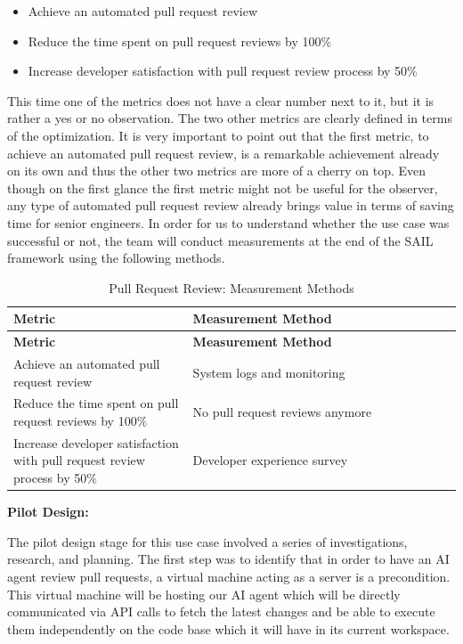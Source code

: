\documentclass[]{imc-inf}
\def\tightlist{}
\begin{document}
\begin{itemize}
	\tightlist
	\item
	Achieve an automated pull request review 
	\item
	Reduce the time spent on pull request reviews by 100\%
	\item
	Increase developer satisfaction with pull request review process by 50\%
\end{itemize}

This time one of the metrics does not have a clear number next to it, but it is rather a yes or no observation. The two other metrics are clearly defined in terms of the optimization. It is very important to point out that the first metric, to achieve an automated pull request review, is a remarkable achievement already on its own and thus the other two metrics are more of a cherry on top. Even though on the first glance the first metric might not be useful for the observer, any type of automated pull request review already brings value in terms of saving time for senior engineers. In order for us to understand whether the use case was successful or not, the team will conduct measurements at the end of the SAIL framework using the following methods. 

\begin{longtable}{|p{0.4\linewidth}|p{0.6\linewidth}|}
	\hline
	\textbf{Metric} & \textbf{Measurement Method} \\
	\hline
	\endfirsthead
	\hline
	\textbf{Metric} & \textbf{Measurement Method} \\
	\hline
	\endhead
	\hline
	\caption{Pull Request Review: Measurement Methods}
	\label{tab:pr_review_metrics}
	\endlastfoot
	
	Achieve an automated pull request review &
	System logs and monitoring \\
	\hline
	
	Reduce the time spent on pull request reviews by 100\% &
	No pull request reviews anymore \\
	\hline
	
	Increase developer satisfaction with pull request review process by 50\% &
	Developer experience survey \\
\end{longtable}

\textbf{Pilot Design:}


The pilot design stage for this use case involved a series of investigations, research, and planning. The first step was to identify that in order to have an AI agent review pull requests, a virtual machine acting as a server is a precondition.
This virtual machine will be hosting our AI agent which will be directly communicated via API calls to fetch the latest changes and be able to execute them independently on the code base which it will have in its current workspace. 
\end{document}
